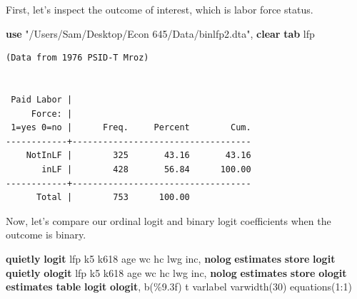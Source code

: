 \documentclass[
]{book}
\newenvironment{Shaded}{\begin{snugshade}}{\end{snugshade}}
\newcommand{\KeywordTok}[1]{\textcolor[rgb]{0.13,0.29,0.53}{\textbf{#1}}}
\newcommand{\NormalTok}[1]{#1}
\newcommand{\StringTok}[1]{\textcolor[rgb]{0.31,0.60,0.02}{#1}}
\begin{document}
First, let's inspect the outcome of interest, which is labor force status.

\begin{Shaded}
\begin{Highlighting}[]
\KeywordTok{use} \StringTok{"/Users/Sam/Desktop/Econ 645/Data/binlfp2.dta"}\NormalTok{, }\KeywordTok{clear}
\KeywordTok{tab}\NormalTok{ lfp}
\end{Highlighting}
\end{Shaded}

\begin{verbatim}
(Data from 1976 PSID-T Mroz)


 Paid Labor |
     Force: |
 1=yes 0=no |      Freq.     Percent        Cum.
------------+-----------------------------------
    NotInLF |        325       43.16       43.16
       inLF |        428       56.84      100.00
------------+-----------------------------------
      Total |        753      100.00
\end{verbatim}

Now, let's compare our ordinal logit and binary logit coefficients when the outcome is binary.

\begin{Shaded}
\begin{Highlighting}[]
\KeywordTok{quietly} \KeywordTok{logit}\NormalTok{ lfp k5 k618 age wc hc lwg inc, }\KeywordTok{nolog}
\KeywordTok{estimates} \KeywordTok{store} \KeywordTok{logit}
\KeywordTok{quietly} \KeywordTok{ologit}\NormalTok{ lfp k5 k618 age wc hc lwg inc, }\KeywordTok{nolog}
\KeywordTok{estimates} \KeywordTok{store} \KeywordTok{ologit}
\KeywordTok{estimates} \KeywordTok{table} \KeywordTok{logit} \KeywordTok{ologit}\NormalTok{, b(\%9.3f) t varlabel varwidth(30) equations(1:1)}
\end{Highlighting}
\end{Shaded}
\end{document}
